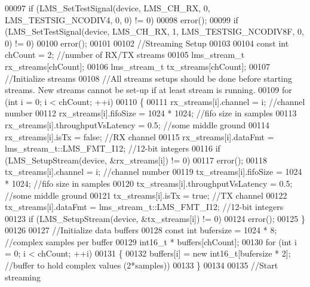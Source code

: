 \begin{DoxyCode}
00097     \textcolor{keywordflow}{if} (LMS_SetTestSignal(device, LMS_CH_RX, 0, LMS_TESTSIG_NCODIV4, 0, 0) != 0)
00098         error();
00099     \textcolor{keywordflow}{if} (LMS_SetTestSignal(device, LMS_CH_RX, 1, LMS_TESTSIG_NCODIV8F, 0, 0) != 0)
00100         error();
00101 
00102     \textcolor{comment}{//Streaming Setup}
00103 
00104     \textcolor{keyword}{const} \textcolor{keywordtype}{int} chCount = 2; \textcolor{comment}{//number of RX/TX streams}
00105     lms_stream_t rx\_streams[chCount];
00106     lms_stream_t tx\_streams[chCount];
00107     \textcolor{comment}{//Initialize streams}
00108     \textcolor{comment}{//All streams setups should be done before starting streams. New streams cannot be set-up if at least
       stream is running.}
00109     \textcolor{keywordflow}{for} (\textcolor{keywordtype}{int} i = 0; i < chCount; ++i)
00110     \{
00111         rx\_streams[i].channel = i; \textcolor{comment}{//channel number}
00112         rx\_streams[i].fifoSize = 1024 * 1024; \textcolor{comment}{//fifo size in samples}
00113         rx\_streams[i].throughputVsLatency = 0.5; \textcolor{comment}{//some middle ground}
00114         rx\_streams[i].isTx = \textcolor{keyword}{false}; \textcolor{comment}{//RX channel}
00115         rx\_streams[i].dataFmt = lms_stream_t::LMS_FMT_I12; \textcolor{comment}{//12-bit integers}
00116         \textcolor{keywordflow}{if} (LMS_SetupStream(device, &rx\_streams[i]) != 0)
00117             error();
00118         tx\_streams[i].channel = i; \textcolor{comment}{//channel number}
00119         tx\_streams[i].fifoSize = 1024 * 1024; \textcolor{comment}{//fifo size in samples}
00120         tx\_streams[i].throughputVsLatency = 0.5; \textcolor{comment}{//some middle ground}
00121         tx\_streams[i].isTx = \textcolor{keyword}{true}; \textcolor{comment}{//TX channel}
00122         tx\_streams[i].dataFmt = lms_stream_t::LMS_FMT_I12; \textcolor{comment}{//12-bit integers}
00123         \textcolor{keywordflow}{if} (LMS_SetupStream(device, &tx\_streams[i]) != 0)
00124             error();
00125     \}
00126 
00127     \textcolor{comment}{//Initialize data buffers}
00128     \textcolor{keyword}{const} \textcolor{keywordtype}{int} bufersize = 1024 * 8; \textcolor{comment}{//complex samples per buffer}
00129     int16\_t * buffers[chCount];
00130     \textcolor{keywordflow}{for} (\textcolor{keywordtype}{int} i = 0; i < chCount; ++i)
00131     \{
00132         buffers[i] = \textcolor{keyword}{new} int16\_t[bufersize * 2]; \textcolor{comment}{//buffer to hold complex values (2*samples))}
00133     \}
00134 
00135     \textcolor{comment}{//Start streaming}

\end{DoxyCode}
